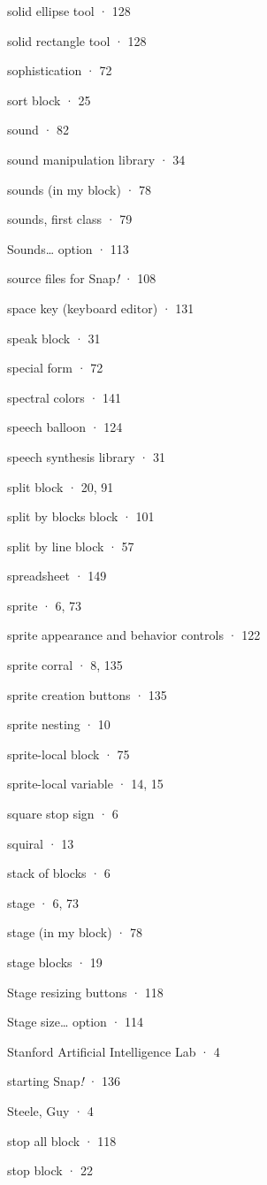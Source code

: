 solid ellipse tool · 128

solid rectangle tool · 128

sophistication · 72

sort block · 25

sound · 82

sound manipulation library · 34

sounds (in my block) · 78

sounds, first class · 79

Sounds\ldots{} option · 113

source files for Snap\emph{!} · 108

space key (keyboard editor) · 131

speak block · 31

special form · 72

spectral colors · 141

speech balloon · 124

speech synthesis library · 31

split block · 20, 91

split by blocks block · 101

split by line block · 57

spreadsheet · 149

sprite · 6, 73

sprite appearance and behavior controls · 122

sprite corral · 8, 135

sprite creation buttons · 135

sprite nesting · 10

sprite-local block · 75

sprite-local variable · 14, 15

square stop sign · 6

squiral · 13

stack of blocks · 6

stage · 6, 73

stage (in my block) · 78

stage blocks · 19

Stage resizing buttons · 118

Stage size\ldots{} option · 114

Stanford Artificial Intelligence Lab · 4

starting Snap\emph{!} · 136

Steele, Guy · 4

stop all block · 118

stop block · 22

